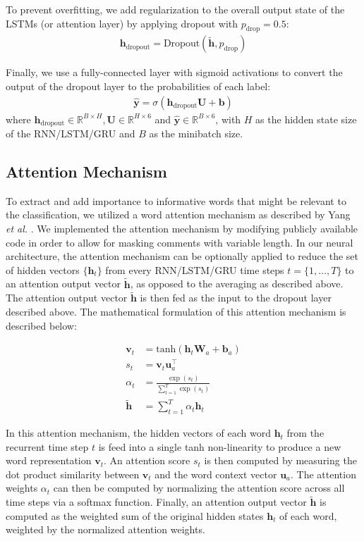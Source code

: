 \documentclass{article} %
\begin{document}
To prevent overfitting, we add regularization to the overall output state of the LSTMs (or attention layer) by applying dropout \cite{dropout} with $p_{\text{drop}} = 0.5$:
\begin{align*}
	\bm{h}_{\text{dropout}} = \text{Dropout}(\bm{\tilde{h}}, p_{\text{drop}})
\end{align*}

Finally, we use a fully-connected layer with sigmoid activations to convert the output of the dropout layer to the probabilities of each label:
\begin{align*}
	\bm{\hat{y}} = \sigma \left( \bm{h}_{\text{dropout}} \bm{U} + \bm{b} \right)
\end{align*}
where $\bm{h}_{\text{dropout}} \in \mathbb{R}^{B \times H}, \bm{U} \in \mathbb{R}^{H \times 6}$ and $\bm{\hat{y}} \in \mathbb{R}^{B \times 6}$, with $H$ as the hidden state size of the RNN/LSTM/GRU and $B$ as the minibatch size.

\subsection{Attention Mechanism}

To extract and add importance to informative words that might be relevant to the classification, we utilized a word attention mechanism as described by Yang \textit{et al.} \cite{attention_paper}. We implemented the attention mechanism by modifying publicly available code \cite{attention_code} in order to allow for masking comments with variable length. In our neural architecture, the attention mechanism can be optionally applied to reduce the set of hidden vectors $\{\bm{h}_t\}$ from every RNN/LSTM/GRU time steps $t = \{1, \dots, T\}$ to an attention output vector $\bm{\tilde{h}}$, as opposed to the averaging as described above. The attention output vector $\bm{\tilde{h}}$ is then fed as the input to the dropout layer described above. The mathematical formulation of this attention mechanism is described below:

\begin{align*}
	\bm{v}_t &= \text{tanh}(\bm{h}_t \bm{W}_a + \bm{b}_a) \\
    s_t &= \bm{v}_t \bm{u}_a^\top \\
    \alpha_t &= \frac{\exp(s_t)}{\sum^T_{t=1} \exp(s_t)} \\
    \bm{\tilde{h}} &= \sum^T_{t=1} \alpha_t \bm{h}_t
\end{align*}

In this attention mechanism, the hidden vectors of each word $\bm{h}_t$ from the recurrent time step $t$ is feed into a single tanh non-linearity to produce a new word representation $\bm{v}_t$. An attention score $s_t$ is then computed by measuring the dot product similarity between $\bm{v}_t$ and the word context vector $\bm{u}_a$. The attention weights $\alpha_t$ can then be computed by normalizing the attention score across all time steps via a softmax function. Finally, an attention output vector $\bm{\tilde{h}}$ is computed as the weighted sum of the original hidden states $\bm{h}_t$ of each word, weighted by the normalized attention weights. 
\end{document}
